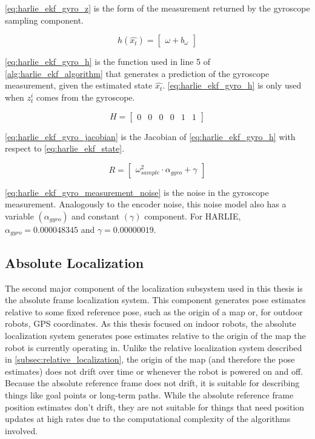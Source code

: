 \eqref{eq:harlie_ekf_gyro_z} is the form of the measurement returned by the gyroscope sampling component.

\begin{equation}
	h\left(\hat{x_t}\right) =
	\begin{bmatrix}
		\omega + b_{\omega}
	\end{bmatrix}
	\label{eq:harlie_ekf_gyro_h}
\end{equation}

\eqref{eq:harlie_ekf_gyro_h} is the function used in line 5 of \autoref{alg:harlie_ekf_algorithm} that generates a prediction of the gyroscope measurement, given the estimated state $\hat{x_t}$. \eqref{eq:harlie_ekf_gyro_h} is only used when $z_t^i$ comes from the gyroscope.

\begin{equation}
	H =
	\begin{bmatrix}
		0 & 0 & 0 & 0 & 1 & 1
	\end{bmatrix}
	\label{eq:harlie_ekf_gyro_jacobian}
\end{equation}

\eqref{eq:harlie_ekf_gyro_jacobian} is the Jacobian of \eqref{eq:harlie_ekf_gyro_h} with respect to \eqref{eq:harlie_ekf_state}.

\begin{equation}
	R =
	\begin{bmatrix}
		\omega_{sample}^2 \cdot \alpha_{gyro} + \gamma
	\end{bmatrix}
	\label{eq:harlie_ekf_gyro_measurement_noise}
\end{equation}

\eqref{eq:harlie_ekf_gyro_measurement_noise} is the noise in the gyroscope measurement. Analogously to the encoder noise, this noise model also has a variable $\left(\alpha_{gyro}\right)$ and constant $\left(\gamma\right)$ component. For HARLIE, $\alpha_{gyro} = 0.000048345$ and $\gamma = 0.00000019$.

\subsection{Absolute Localization}\label{subsec:absolute_localization}

The second major component of the localization subsystem used in this thesis is the absolute frame localization system. This component generates pose estimates relative to some fixed reference pose, such as the origin of a map or, for outdoor robots, GPS coordinates. As this thesis focused on indoor robots, the absolute localization system generates pose estimates relative to the origin of the map the robot is currently operating in. Unlike the relative localization system described in \autoref{subsec:relative_localization}, the origin of the map (and therefore the pose estimates) does not drift over time or whenever the robot is powered on and off. Because the absolute reference frame does not drift, it is suitable for describing things like goal points or long-term paths. While the absolute reference frame position estimates don't drift, they are not suitable for things that need position updates at high rates due to the computational complexity of the algorithms involved.

